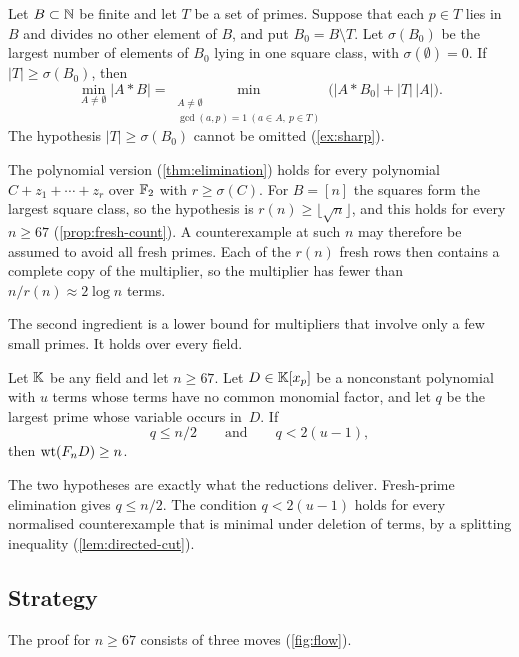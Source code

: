 \begin{theorem}\label{thm:elim-set}
Let $B\subset\mathbb{N}$ be finite and let $T$ be a set of primes. Suppose that each $p\in T$ lies in $B$ and divides no other element of $B$, and put $B_0=B\setminus T$. Let $\sigma(B_0)$ be the largest number of elements of $B_0$ lying in one square class, with $\sigma(\emptyset)=0$. If $|T|\ge\sigma(B_0)$, then
\[
 \min_{A\ne\emptyset}|A*B|
   =\min_{\substack{A\ne\emptyset\\ \gcd(a,p)=1\ (a\in A,\ p\in T)}}
       \bigl(|A*B_0|+|T|\,|A|\bigr).
\]
The hypothesis $|T|\ge\sigma(B_0)$ cannot be omitted (\cref{ex:sharp}).
\end{theorem}

The polynomial version (\cref{thm:elimination}) holds for every polynomial $C+z_1+\cdots+z_r$ over $\mathbb{F}_2$ with $r\ge\sigma(C)$. For $B=[n]$ the squares form the largest square class, so the hypothesis is $r(n)\ge\lfloor\sqrt n\rfloor$, and this holds for every $n\ge67$ (\cref{prop:fresh-count}). A counterexample at such $n$ may therefore be assumed to avoid all fresh primes. Each of the $r(n)$ fresh rows then contains a complete copy of the multiplier, so the multiplier has fewer than $n/r(n)\approx2\log n$ terms.

The second ingredient is a lower bound for multipliers that involve only a few small primes. It holds over every field.

\begin{theorem}\label{thm:localized-intro}
Let $\mathbb{K}$ be any field and let $n\ge67$. Let $D\in\mathbb{K}[x_p]$ be a nonconstant polynomial with $u$ terms whose terms have no common monomial factor, and let $q$ be the largest prime whose variable occurs in~$D$. If
\[
                q\le n/2\qquad\text{and}\qquad q<2(u-1),
\]
then $\operatorname{wt}(F_nD)\ge n$.
\end{theorem}

The two hypotheses are exactly what the reductions deliver. Fresh-prime elimination gives $q\le n/2$. The condition $q<2(u-1)$ holds for every normalised counterexample that is minimal under deletion of terms, by a splitting inequality (\cref{lem:directed-cut}).

\subsection{Strategy}\label{sec:strategy}
The proof for $n\ge67$ consists of three moves (\cref{fig:flow}).

